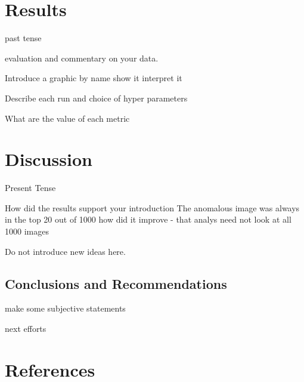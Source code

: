 \documentclass{article}
\begin{document}
\newpage

\section{Results\label{sec:results}}

past tense

evaluation and commentary on your data.

Introduce a graphic by name
show it
interpret it

Describe each run and choice of hyper parameters

What are the value of each metric


\section{Discussion\label{sec:discuss}}

Present Tense

How did the results support your introduction
The anomalous image was always in the top 20 out of 1000
how did it improve - that analys need not look at all 1000 images

Do not introduce new ideas here.


\subsection{Conclusions and Recommendations\label{sec:conclude}}

make some subjective statements

next efforts

\nocite{savitsky:03}





\section*{References\label{sec:cites}}
\end{document}
